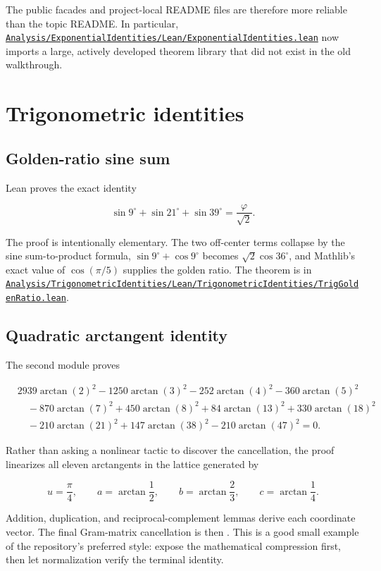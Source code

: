 \documentclass[
  10pt,
  a4paper,
  twoside,
  open=any,
  parskip=half,
  headings=big
]{scrreprt}
\newcommand{\CommitFull}{56a402bf82a9aab119fcbe3e96b991d387b221c5}
\newcommand{\RepoWeb}{https://github.com/VladimirReshetnikov/ProveIt}
\newcommand{\RepoBlobBase}{\RepoWeb/blob/\CommitFull}
\newcommand{\code}[1]{\texttt{\detokenize{#1}}}
\newcommand{\RepoFile}[1]{\href{\RepoBlobBase/#1}{\nolinkurl{#1}}}
\begin{document}
The public facades and project-local README files are therefore more reliable than the topic README. In particular, \RepoFile{Analysis/ExponentialIdentities/Lean/ExponentialIdentities.lean} now imports a large, actively developed theorem library that did not exist in the old walkthrough.

\section{Trigonometric identities}

\subsection{Golden-ratio sine sum}

Lean proves the exact identity

\[
\sin 9^\circ+\sin 21^\circ+\sin 39^\circ=\frac{\varphi}{\sqrt2}.
\]

The proof is intentionally elementary. The two off-center terms collapse by the sine sum-to-product formula, \(\sin9^\circ+\cos9^\circ\) becomes \(\sqrt2\cos36^\circ\), and Mathlib's exact value of \(\cos(\pi/5)\) supplies the golden ratio. The theorem is in \RepoFile{Analysis/TrigonometricIdentities/Lean/TrigonometricIdentities/TrigGoldenRatio.lean}.

\subsection{Quadratic arctangent identity}

The second module proves

\[
\begin{aligned}
&2939\arctan(2)^2-1250\arctan(3)^2-252\arctan(4)^2-360\arctan(5)^2\\
&\quad-870\arctan(7)^2+450\arctan(8)^2+84\arctan(13)^2+330\arctan(18)^2\\
&\quad-210\arctan(21)^2+147\arctan(38)^2-210\arctan(47)^2=0.
\end{aligned}
\]

Rather than asking a nonlinear tactic to discover the cancellation, the proof linearizes all eleven arctangents in the lattice generated by

\[
u=\frac\pi4,
\qquad a=\arctan\frac12,
\qquad b=\arctan\frac23,
\qquad c=\arctan\frac14.
\]

Addition, duplication, and reciprocal-complement lemmas derive each coordinate vector. The final Gram-matrix cancellation is then \code{ring}. This is a good small example of the repository's preferred style: expose the mathematical compression first, then let normalization verify the terminal identity.
\end{document}
